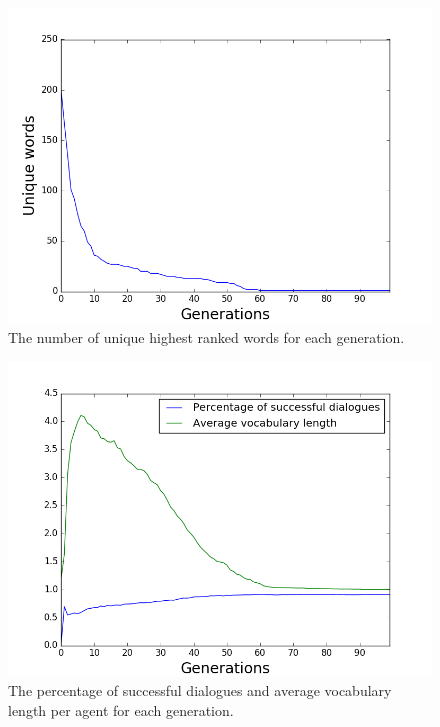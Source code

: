 \begin{figure}[htbp]
    \centering
    \includegraphics[scale=0.5]{fig/Results/Exp1/UniqueWords1}
    \caption{The number of unique highest ranked words for each generation.}
    \label{fig:UniqueWords}
\end{figure}
\begin{figure}[htbp]
    \centering
    \includegraphics[scale=0.5]{fig/Results/Exp1/Vocabulary1}
    \caption{The percentage of successful dialogues and average vocabulary length per agent for each generation.}
    \label{fig:Vocabulary}
\end{figure}
